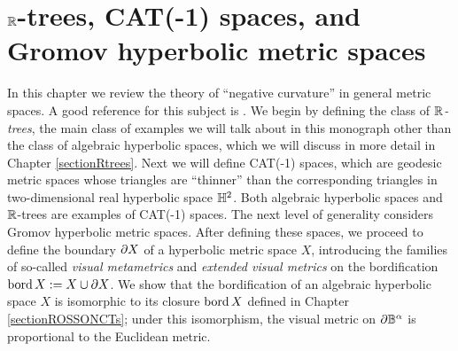 

\chapter{$\R$-trees, CAT(-1) spaces, and Gromov hyperbolic metric spaces} \label{sectiongeometry1}

In this chapter we review the theory of ``negative curvature'' in general metric spaces. A good reference for this subject is \cite{BridsonHaefliger}. We begin by defining the class of \emph{$\R$-trees}, the main class of examples we will talk about in this monograph other than the class of algebraic hyperbolic spaces, which we will discuss in more detail in Chapter \ref{sectionRtrees}. Next we will define CAT(-1) spaces, which are geodesic metric spaces whose triangles are ``thinner'' than the corresponding triangles in two-dimensional real hyperbolic space $\H^2$. Both algebraic hyperbolic spaces and $\R$-trees are examples of CAT(-1) spaces. The next level of generality considers Gromov hyperbolic metric spaces. After defining these spaces, we proceed to define the boundary $\partial X$ of a hyperbolic metric space $X$, introducing the families of so-called \emph{visual metametrics} and \emph{extended visual metrics} on the bordification $\operatorname{bord} X := X\cup\partial X$. We show that the bordification of an algebraic hyperbolic space $X$ is isomorphic to its closure $\operatorname{bord} X$ defined in Chapter \ref{sectionROSSONCTs}; under this isomorphism, the visual metric on $\del \B^\alpha$ is proportional to the Euclidean metric.

